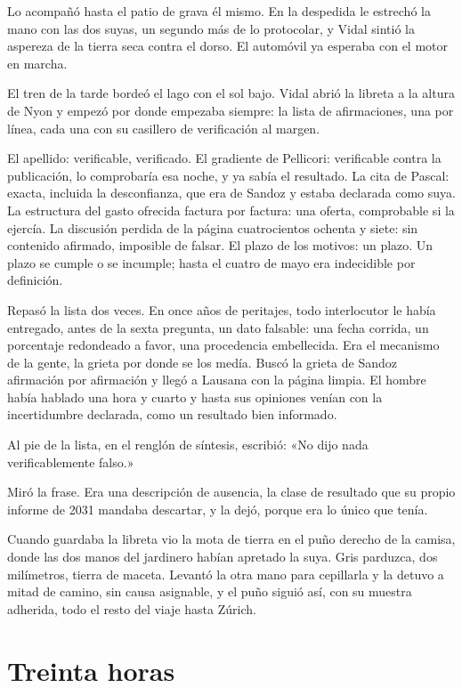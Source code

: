 Lo acompañó hasta el patio de grava él mismo. En la despedida le estrechó la mano con las dos suyas, un segundo más de lo protocolar, y Vidal sintió la aspereza de la tierra seca contra el dorso. El automóvil ya esperaba con el motor en marcha.


\scenebreak


El tren de la tarde bordeó el lago con el sol bajo. Vidal abrió la libreta a la altura de Nyon y empezó por donde empezaba siempre: la lista de afirmaciones, una por línea, cada una con su casillero de verificación al margen.

El apellido: verificable, verificado. El gradiente de Pellicori: verificable contra la publicación, lo comprobaría esa noche, y ya sabía el resultado. La cita de Pascal: exacta, incluida la desconfianza, que era de Sandoz y estaba declarada como suya. La estructura del gasto ofrecida factura por factura: una oferta, comprobable si la ejercía. La discusión perdida de la página cuatrocientos ochenta y siete: sin contenido afirmado, imposible de falsar. El plazo de los motivos: un plazo. Un plazo se cumple o se incumple; hasta el cuatro de mayo era indecidible por definición.

Repasó la lista dos veces. En once años de peritajes, todo interlocutor le había entregado, antes de la sexta pregunta, un dato falsable: una fecha corrida, un porcentaje redondeado a favor, una procedencia embellecida. Era el mecanismo de la gente, la grieta por donde se los medía. Buscó la grieta de Sandoz afirmación por afirmación y llegó a Lausana con la página limpia. El hombre había hablado una hora y cuarto y hasta sus opiniones venían con la incertidumbre declarada, como un resultado bien informado.

Al pie de la lista, en el renglón de síntesis, escribió: «No dijo nada verificablemente falso.»

Miró la frase. Era una descripción de ausencia, la clase de resultado que su propio informe de 2031 mandaba descartar, y la dejó, porque era lo único que tenía.

Cuando guardaba la libreta vio la mota de tierra en el puño derecho de la camisa, donde las dos manos del jardinero habían apretado la suya. Gris parduzca, dos milímetros, tierra de maceta. Levantó la otra mano para cepillarla y la detuvo a mitad de camino, sin causa asignable, y el puño siguió así, con su muestra adherida, todo el resto del viaje hasta Zúrich.

\clearpage

\chapter{Treinta horas}

